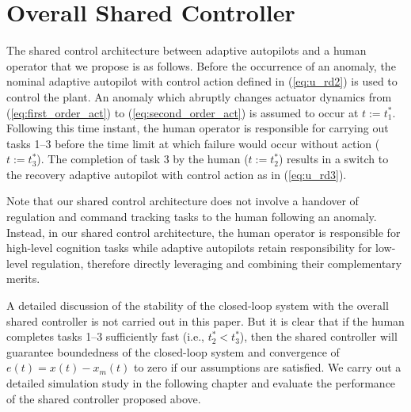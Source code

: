 \section{Overall Shared Controller}\label{subsec:sc_overall}
The shared control architecture between adaptive autopilots and a human operator that we propose is as follows. Before the occurrence of an anomaly, the nominal adaptive autopilot with control action defined in (\ref{eq:u_rd2}) is used to control the plant. An anomaly which abruptly changes actuator dynamics from (\ref{eq:first_order_act}) to (\ref{eq:second_order_act}) is assumed to occur at $t := t_1^*$. Following this time instant, the human operator is responsible for carrying out tasks 1--3 before the time limit at which failure would occur without action ($t:=t_3^*$). The completion of task 3 by the human ($t := t_2^*$) results in a switch to the recovery adaptive autopilot with control action as in (\ref{eq:u_rd3}). 

Note that our shared control architecture does not involve a handover of regulation and command tracking tasks to the human following an anomaly. Instead, in our shared control architecture, the human operator is responsible for high-level cognition tasks while adaptive autopilots retain responsibility for low-level regulation, therefore directly leveraging and combining their complementary merits.

A detailed discussion of the stability of the closed-loop system with the overall shared controller is not carried out in this paper. But it is clear that if the human completes tasks 1--3 sufficiently fast (i.e., $t_2^* < t_3^*$), then the shared controller will guarantee boundedness of the closed-loop system and convergence of $e(t) = x(t) - x_m(t)$ to zero if our assumptions are satisfied. We carry out a detailed simulation study in the following chapter and evaluate the performance of the shared controller proposed above.
